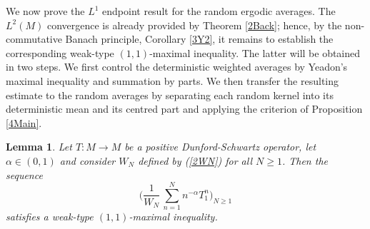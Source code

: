 \documentclass[12pt]{amsart}
\newtheorem{lemma}[theorem]{Lemma}
\theoremstyle{remark}
\theoremstyle{definition}
\numberwithin{equation}{section}
\begin{document}
We now prove the $L^1$ endpoint result for the random ergodic averages. The
$L^2(M)$ convergence is already provided by Theorem \ref{2Back}; hence,
by the non-commutative Banach principle, Corollary \ref{3Y2}, it remains to establish the
corresponding weak-type $(1,1)$-maximal inequality. The latter will be
obtained in two steps. We first control the deterministic weighted
averages by Yeadon's maximal inequality and summation by parts. We then
transfer the resulting estimate to the random averages by separating
each random kernel into its deterministic mean and its centred part
and applying the criterion of Proposition \ref{4Main}.




\begin{lemma}\label{5Av-Y}
Let $T\colon M\to M$ be a positive Dunford-Schwartz operator, let $\alpha\in(0,1)$ and consider $W_N$ defined by (\ref{2WN}) for all $N\geq 1$. Then the sequence
$$
\biggl(\frac{1}{W_N}\,\sum_{n=1}^N
n^{-\alpha} T_1^n\biggr)_{N\geq 1}
$$
satisfies a weak-type
$(1,1)$-maximal inequality.
\end{lemma}
\end{document}
